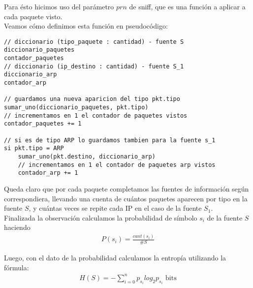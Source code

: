 Para \'esto hicimos uso del par\'ametro $prn$ de sniff, que es una funci\'on a aplicar a cada paquete visto. \\
Veamos c\'omo definimos esta funci\'on en pseudoc\'odigo:

\begin{verbatim}
// diccionario (tipo_paquete : cantidad) - fuente S
diccionario_paquetes
contador_paquetes
// diccionario (ip_destino : cantidad) - fuente S_1
diccionario_arp
contador_arp

// guardamos una nueva aparicion del tipo pkt.tipo
sumar_uno(diccionario_paquetes, pkt.tipo)
// incrementamos en 1 el contador de paquetes vistos
contador_paquetes += 1

// si es de tipo ARP lo guardamos tambien para la fuente s_1
si pkt.tipo = ARP
	sumar_uno(pkt.destino, diccionario_arp)
	// incrementamos en 1 el contador de paquetes arp vistos
	contador_arp += 1
\end{verbatim}

Queda claro que por cada paquete completamos las fuentes de informaci\'on seg\'un correspondiera, llevando una cuenta de cu\'antos paquetes aparecen por tipo en la fuente $S$, y cu\'antas veces se repite cada IP en el caso de la fuente $S_1$. \\

Finalizada la observaci\'on calculamos la probabilidad de s\'imbolo $s_{i}$ de la fuente $S$ haciendo\\
\begin{gather*}
P(s_{i}) = \frac{cant(s_{i})}{\#S}  
\end{gather*}
\vspace{0.5cm}

Luego, con el dato de la probabilidad calculamos la entrop\'ia utilizando la f\'ormula:\\
\begin{gather*}
H(S) = - \sum_{i = 0}^{n} p_{s_{i}}log_{2}p_{s_{i}}  \text{ bits}
\end{gather*}
\vspace{1cm}
